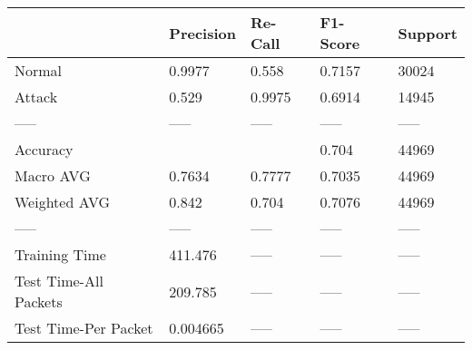 \begin{tabular}{lllll}
\toprule
{} & Precision & Re-Call & F1-Score & Support \\
\midrule
Normal                &    0.9977 &   0.558 &   0.7157 &   30024 \\
Attack                &     0.529 &  0.9975 &   0.6914 &   14945 \\
-----                 &     ----- &   ----- &    ----- &   ----- \\
Accuracy              &           &         &    0.704 &   44969 \\
Macro AVG             &    0.7634 &  0.7777 &   0.7035 &   44969 \\
Weighted AVG          &     0.842 &   0.704 &   0.7076 &   44969 \\
-----                 &     ----- &   ----- &    ----- &   ----- \\
Training Time         &   411.476 &   ----- &    ----- &   ----- \\
Test Time-All Packets &   209.785 &   ----- &    ----- &   ----- \\
Test Time-Per Packet  &  0.004665 &   ----- &    ----- &   ----- \\
\bottomrule
\end{tabular}
